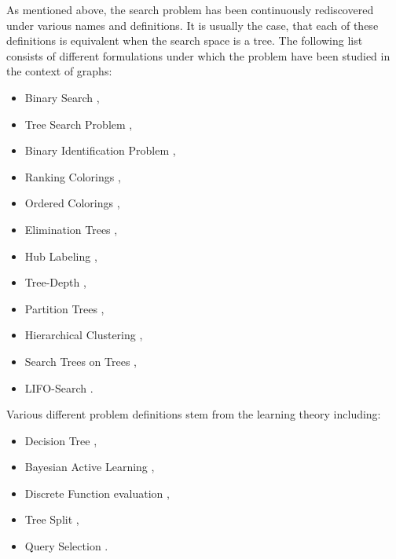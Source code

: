 As mentioned above, the search problem has been continuously rediscovered under various names and definitions. It is usually the case, that each of these definitions is equivalent when the search space is a tree. The following list consists of different formulations under which the problem have been studied in the context of graphs: 
\begin{itemize}
    \item Binary Search \cite{OnakParys2006GenOfBSSInTsAndFLikePosets, dereniowski2017ApproxSsForGeneralBSinWTs, Deligkas2019BsInGsRev, Emamjomeh2016DetAndProbBSinGs, dereniowski2022CFApproxAlgForBSInTsWithMonoQTimes, dereniowski2024SInTsMonoQTs, noisyBSSFC, Dereniowski2024OnMG, EfficientNoisyBinarySearch, Dereniowski2023Edge},
    \item Tree Search Problem \cite{Jacobs2010OnTheComplexSearchInTsAvg, Cicalese2014ImprovedApproxAvgTs, Cicalese2016OnTSPwNonUniCost}, 
    \item Binary Identification Problem \cite{Cicalese2012BinIdentPForWTs, Karbasi2013Constrained}, 
    \item Ranking Colorings \cite{Knuth1973, Dereniowski2009ERankOfWTs, DereniowskiERAndSInPOSets, DereniowskiEfPQProcByGRank, DereniowskiVxRankOfChGsAndWTs, Lam1998ERankOfGsIsH}, 
    \item Ordered Colorings \cite{KATCHALSKI1995141}, 
    \item Elimination Trees \cite{Pothen1988OptimalEliminationTrees}, 
    \item Hub Labeling \cite{Angelidakis2018ShortestPQ},
    \item Tree-Depth \cite{NESETRIL20061022, BOROWIECKI2023113682},
    \item Partition Trees \cite{OnDasHC, Hgemo2024TightAB},
    \item Hierarchical Clustering \cite{Approximatehierarchicalclusteringviasparsestcutandspreadingmetrics}, 
    \item Search Trees on Trees \cite{SplayTonT, Fast_app_centroid_trees}, 
    \item LIFO-Search \cite{GIANNOPOULOU20122089}. 
\end{itemize}
Various different problem definitions stem from the learning theory including:
\begin{itemize}
    \item Decision Tree \cite{LABER2004209,ATightAnalysisofGreedy, GuptasApproxAlgsForOptDTsAndAdaptTSPPs, Tradingoff},
    \item Bayesian Active Learning \cite{NearoptimalBayesianactivelearning,Analysisofgreedyactivelearningstrategy},
    \item Discrete Function evaluation \cite{Diagnosisdetermination},
    \item Tree Split \cite{OnanOptimalSplitTreeProblem},
    \item Query Selection \cite{QuerySelection}.
\end{itemize}

